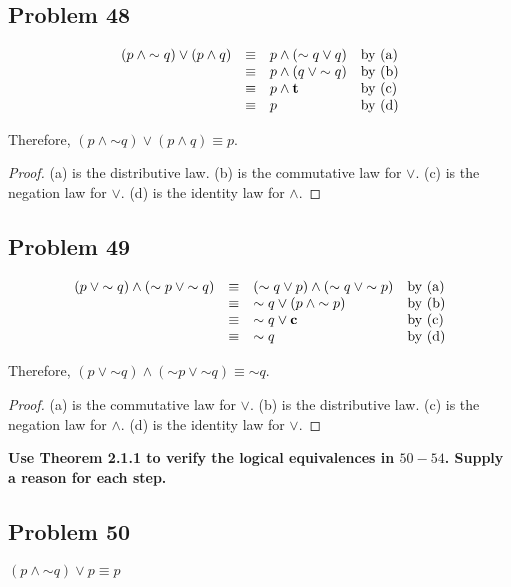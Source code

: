 \documentclass[14pt]{extarticle}
\newcommand{\true}{{\bf t}}
\newcommand{\false}{{\bf c}}
\begin{document}
\subsection{Problem 48}
$$
\begin{array}{rcll}
(p \wedge {\sim q}) \vee (p \wedge q) & \equiv & 
 p \wedge ({\sim q} \vee q) & \text{by (a)} \\
& \equiv & p \wedge (q \vee {\sim q}) & \text{by (b)} \\
& \equiv & p \wedge \true & \text{by (c)} \\
& \equiv & p & \text{by (d)} \\
\end{array}
$$

Therefore, $(p \wedge {\sim q}) \vee (p \wedge q) \equiv p$.

\begin{proof}
(a) is the distributive law. (b) is the commutative law for $\vee$. (c) is the negation law for $\vee$. (d) is the identity law for $\wedge$.
\end{proof}

\subsection{Problem 49}
$$
\begin{array}{rcll}
(p \vee {\sim q}) \wedge ({\sim p} \vee {\sim q}) & \equiv &
({\sim q} \vee p) \wedge ({\sim q} \vee {\sim p}) & \text{by (a)} \\
& \equiv & {\sim q} \vee (p \wedge {\sim p}) & \text{by (b)} \\
& \equiv & {\sim q} \vee \false & \text{by (c)} \\
& \equiv & {\sim q} & \text{by (d)} \\
\end{array}
$$

Therefore, $(p \vee {\sim q}) \wedge ({\sim p} \vee {\sim q}) \equiv {\sim q}$.

\begin{proof}
(a) is the commutative law for $\vee$. (b) is the distributive law. (c) is the negation law for $\wedge$. (d) is the identity law for $\vee$.
\end{proof}

{\bf Use Theorem 2.1.1 to verify the logical equivalences in $50-54$. Supply a reason for each step.}

\subsection{Problem 50}
$(p \wedge {\sim q}) \vee p \equiv p$
\end{document}
